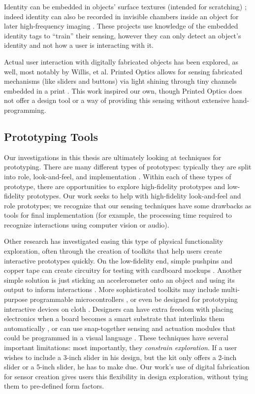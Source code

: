         Identity can be embedded in objects' surface textures (intended for scratching) \cite{harrison-acoustic}; indeed identity can also be recorded in invisible chambers inside an object for later high-frequency imaging \cite{willis-infrastructs}. These projects use knowledge of the embedded identity tags to ``train'' their sensing, however they can only detect an object's identity and not how a user is interacting with it.
        
        Actual user interaction with digitally fabricated objects has been explored, as well, most notably by Willis, et al. Printed Optics allows for sensing fabricated mechanisms (like sliders and buttons) via light shining through tiny channels embedded in a print \cite{willis-printedoptics}. This work inspired our own, though Printed Optics does not offer a design tool or a way of providing this sensing without extensive hand-programming.

\subsection{Prototyping Tools}

    Our investigations in this thesis are ultimately looking at techniques for prototyping. There are many different types of prototypes: typically they are split into role, look-and-feel, and implementation \cite{houde-prototypes}. Within each of these types of prototype, there are opportunities to explore high-fidelity prototypes and low-fidelity prototypes. Our work seeks to help with high-fidelity look-and-feel and role prototypes; we recognize that our sensing techniques have some drawbacks as tools for final implementation (for example, the processing time required to recognize interactions using computer vision or audio).
    
    Other research has investigated easing this type of physical functionality exploration, often through the creation of toolkits that help users create interactive prototypes quickly. On the low-fidelity end, simple pushpins and copper tape can create circuitry for testing with cardboard mockups \cite{hudson-boxes}. Another simple solution is just sticking an accelerometer onto an object and using its output to inform interactions \cite{hook-making}. More sophisticated toolkits may include multi-purpose programmable microcontrollers \cite{arduino}, or even be designed for prototyping interactive devices on cloth \cite{buechley-lilypad}. Designers can have extra freedom with placing electronics when a board becomes a smart substrate that interlinks them automatically \cite{villar-voodooio}, or can use snap-together sensing and actuation modules \cite{avrahami-switcharoo, greenberg-phidgets, lee-calder} that could be programmed in a visual language \cite{villar-gadgeteer}. These techniques have several important limitations: most importantly, they \emph{constrain exploration}. If a user wishes to include a 3-inch slider in his design, but the kit only offers a 2-inch slider or a 5-inch slider, he has to make due. Our work's use of digital fabrication for sensor creation gives users this flexibility in design exploration, without tying them to pre-defined form factors.
    
